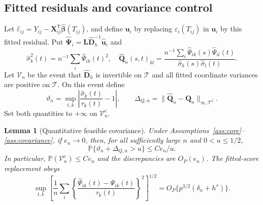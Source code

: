 \documentclass[12pt]{article}
\newtheorem{lemma}{Lemma}
\newcommand{\bu}{{\mathbf u}}
\newcommand{\bD}{{\mathbf D}}
\newcommand{\bL}{{\mathbf L}}
\newcommand{\bQ}{{\mathbf Q}}
\newcommand{\bX}{{\mathbf X}}
\newcommand{\bbeta}  {\boldsymbol{\beta}}
\newcommand{\bPsi} {\boldsymbol{\Psi}}
\newcommand{\prob}{\mathbb{P}}
\newcommand{\trans}{{\scriptscriptstyle\mathsf{T}}}
\numberwithin{equation}{section}
\begin{document}
\subsection{Fitted residuals and covariance control}

Let $\widehat\varepsilon_{ij}=Y_{ij}-\bX_{ij}^\trans
\widehat{\bbeta}(T_{ij})$, and define $\widehat\bu_i$ by replacing
$\varepsilon_i(T_{ij})$ in $\bu_i$ by this fitted residual.  Put
$\widehat{\bPsi}_i=\bL\widehat{\bD}_h^{-1}\widehat\bu_i$ and
\[
\widehat\sigma_k^2(t)=n^{-1}\sum_i\widehat\Psi_{ik}(t)^2,
\quad
\widehat{\bQ}_n(s,t)_{kl}=
\frac{n^{-1}\sum_i\widehat\Psi_{ik}(s)\widehat\Psi_{il}(t)}
{\widehat\sigma_k(s)\widehat\sigma_l(t)}.
\]
Let $\mathcal V_n$ be the event that $\widehat{\bD}_h$ is invertible
on $\mathcal T$ and all fitted coordinate variances are positive
on $\mathcal T$.  On this event define
\[
\vartheta_n=\sup_{t,k}\left|
\frac{\widehat\sigma_k(t)}{\tau_k(t)}-1\right|,
\qquad
\Delta_{Q,n}=\|\widehat{\bQ}_n-\bQ_n\|_{\infty,\mathcal T^2}.
\]
Set both quantities to $+\infty$ on $\mathcal V_n^c$.

\begin{lemma}[Quantitative feasible covariance]
\label{lem:hd-feasible-covariance}
Under Assumptions~\ref{ass:core}--\ref{ass:covariance}, if $e_n\to0$,
then, for all sufficiently large $n$ and $0<u\le1/2$,
\[
\prob\{\vartheta_n+\Delta_{Q,n}>u\}\le Ce_n/u.
\]
In particular, $\prob(\mathcal V_n^c)\le Ce_n$ and the discrepancies
are $O_P(e_n)$.  The fitted-score replacement obeys
\[
\sup_{t,k}\left[
\frac1n\sum_i
\left\{\frac{\widehat\Psi_{ik}(t)-\Psi_{ik}(t)}{\tau_k(t)}\right\}^2
\right]^{1/2}
=O_P\{p^{3/2}(\delta_n+h^s)\}.
\]
\end{lemma}
\end{document}
